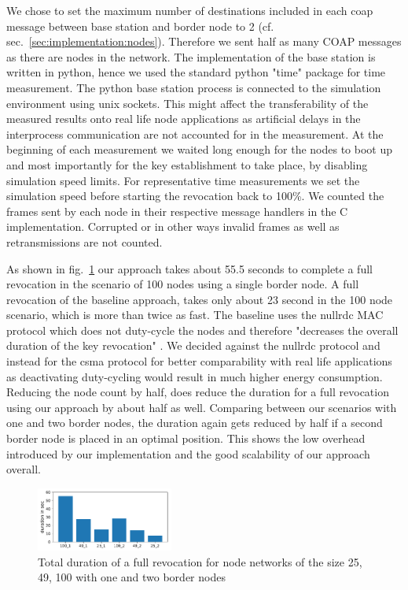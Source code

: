 \documentclass[conference]{IEEEtran}
\begin{document}
We chose to set the maximum number of destinations included in each \ac{coap} message between base station and border node to 2 (cf. sec.~\ref{sec:implementation:nodes}).
Therefore we sent half as many COAP messages as there are nodes in the network.
The implementation of the base station is written in python, hence we used the standard python "time" package for time measurement. 
The python base station process is connected to the simulation environment using unix sockets.
This might affect the transferability of the measured results onto real life node applications as artificial delays in the interprocess communication are not accounted for in the measurement.
At the beginning of each measurement we waited long enough for the nodes to boot up and most importantly for the key establishment to take place, by disabling simulation speed limits.
For representative time measurements we set the simulation speed before starting the revocation back to 100\%.
We counted the frames sent by each node in their respective message handlers in the C implementation.
Corrupted or in other ways invalid frames as well as retransmissions are not counted.

As shown in fig.~\ref{fig:duration} our approach takes about 55.5 seconds to complete a full revocation in the scenario of 100 nodes using a single border node. 
A full revocation of the baseline approach, takes only about 23 second in the 100 node scenario, which is more than twice as fast. 
The baseline uses the nullrdc MAC protocol which does not duty-cycle the nodes and therefore "decreases the overall duration of the key revocation" \cite{DanielWerner}. 
We decided against the nullrdc protocol and instead for the csma protocol for better comparability with real life applications as deactivating duty-cycling would result in much higher energy consumption.
Reducing the node count by half, does reduce the duration for a full revocation using our approach by about half as well. 
Comparing between our scenarios with one and two border nodes, the duration again gets reduced by half if a second border node is placed in an optimal position.
This shows the low overhead introduced by our implementation and the good scalability of our approach overall.
\begin{figure}[t]
	\centering
	\includegraphics[width=0.4\textwidth]{durations}
	\caption{Total duration of a full revocation for node networks of the size 25, 49, 100 with one and two border nodes}
	\label{fig:duration}
\end{figure}
\end{document}
